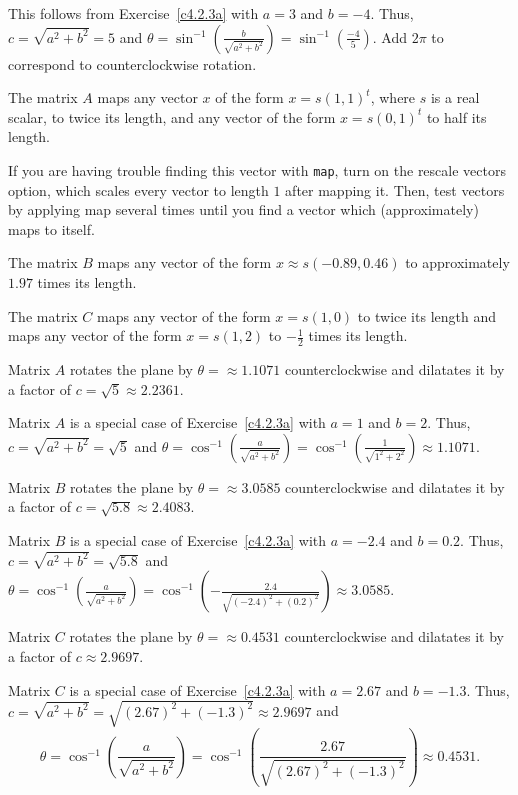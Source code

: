 \documentclass{ximera}
\begin{document}
\soln This follows from Exercise~\ref{c4.2.3a} with $a = 3$
and $b = -4$.  Thus, $c = \sqrt{a^2 + b^2} = 5$ and
$\theta = \sin^{-1}\left(\frac{b}{\sqrt{a^2 + b^2}}\right) = 
\sin^{-1}\left(\frac{-4}{5}\right)$.  Add $2\pi$ to correspond to counterclockwise rotation.

 The matrix $A$ maps any vector $x$ of the form
$x = s(1,1)^t$, where $s$ is a real scalar, to twice its length, and any
vector of the form $x = s(0,1)^t$ to half its length.

\para If you are having trouble finding this vector with {\tt map},
turn on the rescale vectors option, which scales every vector to length
$1$ after mapping it.  Then, test vectors by applying {\sf map} several
times until you find a vector which (approximately) maps to itself.

\newpage
{} The matrix $B$ maps any vector of the form
$x \approx s(-0.89,0.46)$ to approximately $1.97$ times its length.

 The matrix $C$ maps any vector of the form $x = s(1,0)$
to twice its length and maps any vector of the form $x = s(1,2)$ to
$-\frac{1}{2}$ times its length.

 \ans Matrix $A$ rotates the plane by $\theta =
\approx 1.1071$ counterclockwise and dilatates it by a factor of
$c = \sqrt{5} \approx 2.2361$.

\soln Matrix $A$ is a special case of Exercise~\ref{c4.2.3a} with $a = 1$
and $b = 2$.  Thus, $c = \sqrt{a^2 + b^2} = \sqrt{5}$ and
$\theta = \cos^{-1}\left(\frac{a}{\sqrt{a^2 + b^2}}\right) =
\cos^{-1}\left(\frac{1}{\sqrt{1^2 + 2^2}}\right) \approx 1.1071$.

 \ans Matrix $B$ rotates the plane by $\theta =
\approx 3.0585$ counterclockwise and dilatates it by a factor of
$c = \sqrt{5.8} \approx 2.4083$.

\soln Matrix $B$ is a special case of Exercise~\ref{c4.2.3a} with $a = -2.4$
and $b = 0.2$.  Thus, $c = \sqrt{a^2 + b^2} = \sqrt{5.8}$ and
$\theta = \cos^{-1}\left(\frac{a}{\sqrt{a^2 + b^2}}\right) =
\cos^{-1}\left(-\frac{2.4}{\sqrt{(-2.4)^2 + (0.2)^2}}\right) \approx 3.0585$.

 \ans Matrix $C$ rotates the plane by $\theta =
\approx 0.4531$ counterclockwise and dilatates it by a factor of
$c \approx 2.9697$.

\soln Matrix $C$ is a special case of Exercise~\ref{c4.2.3a} with $a = 2.67$
and $b = -1.3$.  Thus, $c = \sqrt{a^2 + b^2} = \sqrt{(2.67)^2 + (-1.3)^2}
\approx 2.9697$ and
\[
\theta = \cos^{-1}\left(\frac{a}{\sqrt{a^2 + b^2}}
\right) = \cos^{-1}\left(\frac{2.67}{\sqrt{(2.67)^2 + (-1.3)^2}}\right)
\approx 0.4531.
\]
\end{document}

